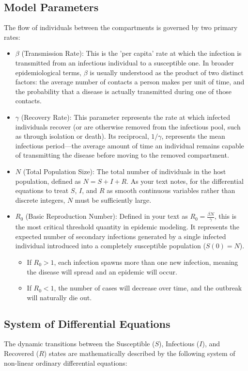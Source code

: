 \documentclass[12pt,a4paper]{article}
\begin{document}
\subsection{Model Parameters}
The flow of individuals between the compartments is governed by two primary rates:
\begin{itemize}
    \item \textbf{$\beta$ }(Transmission Rate): This is the 'per capita' rate at which the infection is transmitted from an infectious individual to a susceptible one. In broader epidemiological terms, $\beta$ is usually understood as the product of two distinct factors: the average number of contacts a person makes per unit of time, and the probability that a disease is actually transmitted during one of those contacts.
    \item \textbf{$\gamma$ }(Recovery Rate): This parameter represents the rate at which infected individuals recover (or are otherwise removed from the infectious pool, such as through isolation or death). Its reciprocal, $1/\gamma$, represents the mean infectious period—the average amount of time an individual remains capable of transmitting the disease before moving to the removed compartment.
    \item \textbf{$N$} (Total Population Size): The total number of individuals in the host population, defined as $N = S + I + R$. As your text notes, for the differential equations to treat $S$, $I$, and $R$ as smooth continuous variables rather than discrete integers, $N$ must be sufficiently large.
    \item \textbf{$R_0$ }(Basic Reproduction Number): Defined in your text as $R_0 = \frac{\beta N}{\gamma}$, this is the most critical threshold quantity in epidemic modeling. It represents the expected number of secondary infections generated by a single infected individual introduced into a completely susceptible population ($S(0) = N$).
    \begin{itemize}
        \item If $R_0 > 1$, each infection spawns more than one new infection, meaning the disease will spread and an epidemic will occur.
        \item If $R_0 < 1$, the number of cases will decrease over time, and the outbreak will naturally die out.
    \end{itemize}
    
\end{itemize}

\subsection{System of Differential Equations}
The dynamic transitions between the Susceptible ($S$), Infectious ($I$), and Recovered ($R$) states are mathematically described by the following system of non-linear ordinary differential equations:
\end{document}
